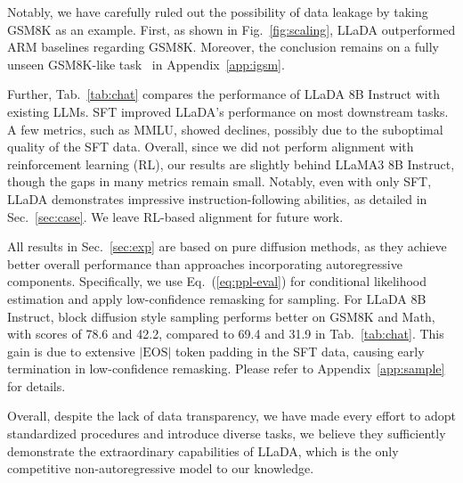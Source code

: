 \documentclass{article}
\begin{document}
Notably, we have carefully ruled out the possibility of data leakage by taking GSM8K as an example. First, as shown in Fig.~\ref{fig:scaling}, LLaDA outperformed ARM baselines regarding GSM8K. Moreover, the conclusion remains on a fully unseen GSM8K-like task~\citep{YXLA2024-gsm1} in Appendix~\ref{app:igsm}.

Further, Tab.~\ref{tab:chat} compares the performance of LLaDA 8B Instruct with existing LLMs. SFT improved LLaDA's performance on most downstream tasks. A few metrics, such as MMLU, showed declines, possibly due to the suboptimal quality of the SFT data. Overall, since we did not perform alignment with reinforcement learning (RL), our results are slightly behind LLaMA3 8B Instruct, though the gaps in many metrics remain small. Notably, even with only SFT, LLaDA demonstrates impressive instruction-following abilities, as detailed in Sec.~\ref{sec:case}. We leave RL-based alignment for future work.

All results in Sec.~\ref{sec:exp} are based on pure diffusion methods, as they achieve better overall performance than approaches incorporating autoregressive components. Specifically, we use Eq.~(\ref{eq:ppl-eval}) for conditional likelihood estimation and apply low-confidence remasking for sampling. For LLaDA 8B Instruct, block diffusion style sampling performs better on GSM8K and Math, with scores of 78.6 and 42.2, compared to 69.4 and 31.9 in Tab.~\ref{tab:chat}. This gain is due to extensive $|\text{EOS}|$ token padding in the SFT data, causing early termination in low-confidence remasking. Please refer to Appendix~\ref{app:sample} for details.

Overall, despite the lack of data transparency, we have made every effort to adopt standardized procedures and introduce diverse tasks, we believe they sufficiently demonstrate the extraordinary capabilities of LLaDA, which is the only competitive non-autoregressive model to our knowledge.
\end{document}
